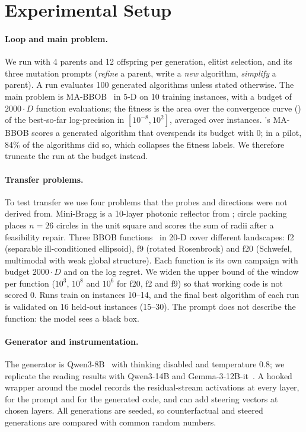 \section{Experimental Setup}\label{sec:setup}

\paragraph{Loop and main problem.}
We run \llamea with 4 parents and 12 offspring per generation, elitist
selection, and its three mutation prompts (\emph{refine} a parent,
write a \emph{new} algorithm, \emph{simplify} a parent). A run evaluates
100 generated algorithms unless stated otherwise. The main problem is
MA-BBOB~\cite{vermetten2025mabbob} in 5-D on 10 training instances, with
a budget of $2000\cdot D$ function evaluations; the fitness is the area
over the convergence curve (\aocc) of the best-so-far log-precision in
$[10^{-8},10^{2}]$, averaged over instances. \blade's MA-BBOB scores a
generated algorithm that overspends its budget with 0; in a pilot, 84\%
of the algorithms did so, which collapses the fitness labels. We
therefore truncate the run at the budget instead.

\paragraph{Transfer problems.}
To test transfer we use four problems that the probes and directions
were not derived from. Mini-Bragg is a 10-layer photonic reflector from
\blade; circle packing places $n=26$ circles in the unit square and
scores the sum of radii after a feasibility repair. Three BBOB
functions~\cite{hansen2009bbob} in 20-D cover different landscapes: f2
(separable ill-conditioned ellipsoid), f9 (rotated Rosenbrock) and f20
(Schwefel, multimodal with weak global structure). Each function is its
own campaign with budget $2000\cdot D$ and \aocc on the log regret. We
widen the upper bound of the \aocc window per function ($10^{3}$,
$10^{8}$ and $10^{6}$ for f20, f2 and f9) so that working code is not
scored 0. Runs train on instances 10--14, and the final best algorithm
of each run is validated on 16 held-out instances (15--30). The prompt
does not describe the function: the model sees a black box.

\paragraph{Generator and instrumentation.}
The generator is Qwen3-8B~\cite{qwen3} with thinking disabled and
temperature 0.8; we replicate the reading results with Qwen3-14B and
Gemma-3-12B-it~\cite{gemma3}. A hooked wrapper around the model records
the residual-stream activations at every layer, for the prompt and for
the generated code, and can add steering vectors at chosen layers. All
generations are seeded, so counterfactual and steered generations are
compared with common random numbers.

